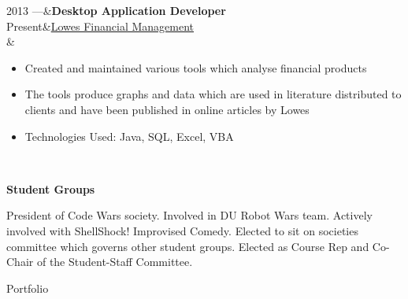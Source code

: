 \documentclass[hidelinks, 12pt, a4paper]{article}
\newcommand{\smitem}[1]{\item {\small {#1}}}
\newenvironment{bullets}{\begin{minipage}[t]{\linewidth}\begin{itemize}[leftmargin=2em,label=-,nosep]}{\end{itemize}\end{minipage}\vspace{5pt}}
\newenvironment{sectionitem}{\vspace{6pt}\noindent\tabularx{\linewidth}{p{70pt}X}}{\endtabularx}
\newcommand{\sectionheader}[1]{
	\vspace{6pt}
	{
		\noindent
		\hspace{3pt}
		\Large\textbf{#1}}}
\begin{document}
\begin{minipage}{0.6\textwidth}
		\begin{sectionitem}
			2013 ---&\textbf{Desktop Application Developer}\\
			Present&\href{http://www.lowes.co.uk}{Lowes Financial Management}\\
			&\begin{bullets}
				\smitem{Created and maintained various tools which analyse financial products}
				\smitem{The tools produce graphs and data which are used in literature distributed to clients and have been published in online articles by Lowes}
				\smitem{Technologies Used: Java, SQL, Excel, VBA}
			\end{bullets}\\
		\end{sectionitem}
	
		\sectionheader{Student Groups}
		\vspace{4pt}
		
		President of Code Wars society. Involved in DU Robot Wars team. Actively involved with ShellShock! Improvised Comedy. Elected to sit on societies committee which governs other student groups. Elected as Course Rep and Co-Chair of the Student-Staff Committee.
	\end{minipage}

	\newpage
	
	\vspace*{12pt}
	
	\begin{center}
		\Huge Portfolio
	\end{center}
	
\end{document}
